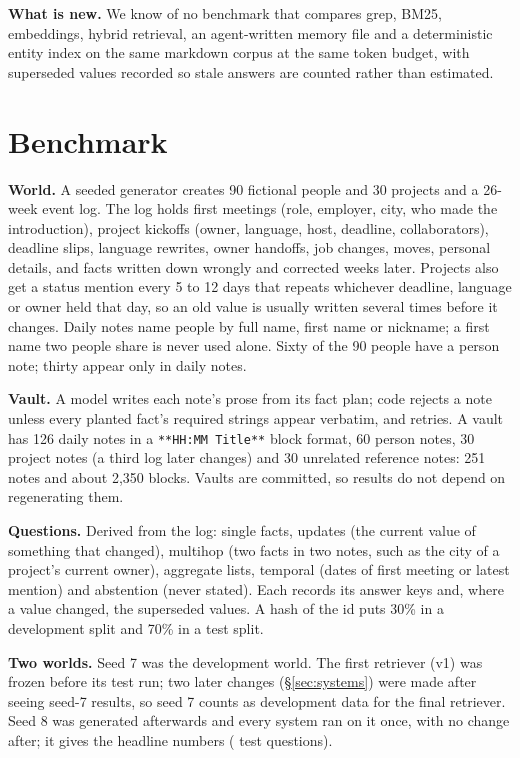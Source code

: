 \documentclass[11pt]{article}
\begin{document}
\textbf{What is new.} We know of no benchmark that compares grep, BM25, embeddings, hybrid retrieval, an agent-written
memory file and a deterministic entity index on the same markdown corpus at the same token budget, with superseded
values recorded so stale answers are counted rather than estimated.

\section{Benchmark}\label{sec:bench}

\textbf{World.} A seeded generator creates 90 fictional people and 30 projects and a 26-week event log. The log
holds first meetings (role, employer, city, who made the introduction), project kickoffs (owner, language, host,
deadline, collaborators), deadline slips, language rewrites, owner handoffs, job changes, moves, personal details,
and facts written down wrongly and corrected weeks later. Projects also get a status mention every 5 to 12 days that
repeats whichever deadline, language or owner held that day, so an old value is usually written several times
before it changes. Daily notes name people by full name, first name or nickname; a first name two people share is
never used alone. Sixty of the 90 people have a person note; thirty appear only in daily notes.

\textbf{Vault.} A model writes each note's prose from its fact plan; code rejects a note unless every planted fact's
required strings appear verbatim, and retries. A vault has 126 daily notes in a \texttt{**HH:MM Title**} block
format, 60 person notes, 30 project notes (a third log later changes) and 30 unrelated reference notes: 251 notes
and about 2,350 blocks. Vaults are committed, so results do not depend on regenerating them.

\textbf{Questions.} Derived from the log: single facts, updates (the current value of something that changed),
multihop (two facts in two notes, such as the city of a project's current owner), aggregate lists, temporal (dates
of first meeting or latest mention) and abstention (never stated). Each records its answer keys and, where a value
changed, the superseded values. A hash of the id puts 30\% in a development split and 70\% in a test split.

\textbf{Two worlds.} Seed 7 was the development world. The first retriever (v1) was frozen before its test run;
two later changes (\S\ref{sec:systems}) were made after seeing seed-7 results, so seed 7 counts as development data
for the final retriever. Seed 8 was generated afterwards and every system ran on it once, with no change after; it
gives the headline numbers (\MainN{} test questions).
\end{document}

